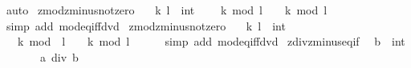 \begin{isabellebody}
\isamarkupfalse%
\ auto%
\endisatagproof
{\isafoldproof}%
%
\isadelimproof
\isanewline
%
\endisadelimproof
\isanewline
{}\isamarkupfalse%
\ zmod{\isacharunderscore}{\kern0pt}zminus{}{\isacharunderscore}{\kern0pt}not{\isacharunderscore}{\kern0pt}zero{\isacharcolon}{\kern0pt}\isanewline
\ \ \ k\ l\ {\isacharcolon}{\kern0pt}{\isacharcolon}{\kern0pt}\ int\isanewline
\ \ \ {\isachardoublequoteopen}{\isacharminus}{\kern0pt}\ k\ mod\ l\ {\isasymnoteq}\ {}\ {\isasymLongrightarrow}\ k\ mod\ l\ {\isasymnoteq}\ {}{\isachardoublequoteclose}\isanewline
%
\isadelimproof
\ \ %
\endisadelimproof
%
\isatagproof
{}\isamarkupfalse%
\ {\isacharparenleft}{\kern0pt}simp\ add{\isacharcolon}{\kern0pt}\ mod{\isacharunderscore}{\kern0pt}eq{\isacharunderscore}{\kern0pt}{}{\isacharunderscore}{\kern0pt}iff{\isacharunderscore}{\kern0pt}dvd{\isacharparenright}{\kern0pt}%
\endisatagproof
{\isafoldproof}%
%
\isadelimproof
\isanewline
%
\endisadelimproof
\isanewline
{}\isamarkupfalse%
\ zmod{\isacharunderscore}{\kern0pt}zminus{}{\isacharunderscore}{\kern0pt}not{\isacharunderscore}{\kern0pt}zero{\isacharcolon}{\kern0pt}\isanewline
\ \ \ k\ l\ {\isacharcolon}{\kern0pt}{\isacharcolon}{\kern0pt}\ int\isanewline
\ \ \ {\isachardoublequoteopen}k\ mod\ {\isacharminus}{\kern0pt}\ l\ {\isasymnoteq}\ {}\ {\isasymLongrightarrow}\ k\ mod\ l\ {\isasymnoteq}\ {}{\isachardoublequoteclose}\isanewline
%
\isadelimproof
\ \ %
\endisadelimproof
%
\isatagproof
{}\isamarkupfalse%
\ {\isacharparenleft}{\kern0pt}simp\ add{\isacharcolon}{\kern0pt}\ mod{\isacharunderscore}{\kern0pt}eq{\isacharunderscore}{\kern0pt}{}{\isacharunderscore}{\kern0pt}iff{\isacharunderscore}{\kern0pt}dvd{\isacharparenright}{\kern0pt}%
\endisatagproof
{\isafoldproof}%
%
\isadelimproof
\isanewline
%
\endisadelimproof
\isanewline
{}\isamarkupfalse%
\ zdiv{\isacharunderscore}{\kern0pt}zminus{}{\isacharunderscore}{\kern0pt}eq{\isacharunderscore}{\kern0pt}if{\isacharcolon}{\kern0pt}\isanewline
\ \ {\isachardoublequoteopen}b\ {\isasymnoteq}\ {\isacharparenleft}{\kern0pt}{}{\isacharcolon}{\kern0pt}{\isacharcolon}{\kern0pt}int{\isacharparenright}{\kern0pt}\isanewline
\ \ \ \ \ \ {\isacharequal}{\kern0pt}{\isacharequal}{\kern0pt}{\isachargreater}{\kern0pt}\ a\ div\ {\isacharparenleft}{\kern0pt}{\isacharminus}{\kern0pt}b{\isacharparenright}{\kern0pt}\ {\isacharequal}{\kern0pt}\isanewline

\end{isabellebody}
